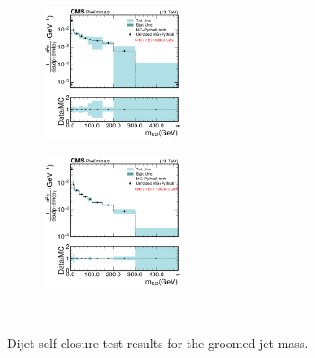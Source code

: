 \begin{figure}[htp!]
\begin{subfigure}
          \centering
          \includegraphics[width=0.45\textwidth]{figures/multijet/unfolding/dijet/closure_binnedResult_groomed_3.pdf}
        \end{subfigure}
        \begin{subfigure}
          \centering
          \includegraphics[width=0.45\textwidth]{figures/multijet/unfolding/dijet/closure_binnedResult_groomed_4.pdf}
        \end{subfigure}\\
	\caption{Dijet self-closure test results for the groomed jet mass.}
	\label{fig:dijetclosurebinned_g}
      \end{figure}
      
